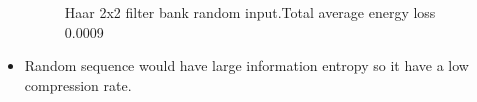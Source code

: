 \documentclass{beamer}
\begin{document}
\begin{frame}
\begin{itemize}
\begin{figure}[ht!]
\begin{minipage}{0.45\textwidth}
                      \caption{Haar 2x2 filter bank random input.Total average energy loss 0.0009}
                  \end{minipage}
              \end{figure}
        \item Random sequence would have large information entropy so it have a low compression rate.
    \end{itemize}
\end{frame}
\end{document}
